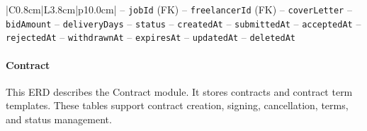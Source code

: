 \begin{center}
\begin{longtable}{|C{0.8cm}|L{3.8cm}|p{10.0cm}|}
\hspace*{1em}-- \texttt{job\allowbreak Id} (FK) \newline
\hspace*{1em}-- \texttt{freelancer\allowbreak Id} (FK) \newline
\hspace*{1em}-- \texttt{cover\allowbreak Letter} \newline
\hspace*{1em}-- \texttt{bid\allowbreak Amount} \newline
\hspace*{1em}-- \texttt{delivery\allowbreak Days} \newline
\hspace*{1em}-- \texttt{status} \newline
\hspace*{1em}-- \texttt{created\allowbreak At} \newline
\hspace*{1em}-- \texttt{submitted\allowbreak At} \newline
\hspace*{1em}-- \texttt{accepted\allowbreak At} \newline
\hspace*{1em}-- \texttt{rejected\allowbreak At} \newline
\hspace*{1em}-- \texttt{withdrawn\allowbreak At} \newline
\hspace*{1em}-- \texttt{expires\allowbreak At} \newline
\hspace*{1em}-- \texttt{updated\allowbreak At} \newline
\hspace*{1em}-- \texttt{deleted\allowbreak At} \\
\hline
\end{longtable}\addtocounter{table}{-1}
\end{center}

\paragraph{Contract}

This ERD describes the Contract module. It stores contracts and contract term templates. These tables support contract creation, signing, cancellation, terms, and status management.

